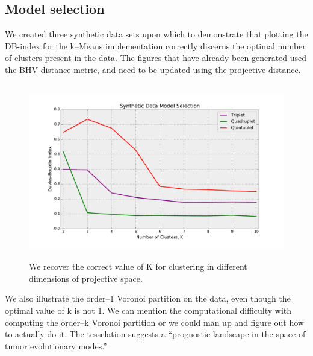 \documentclass[a4paper,11pt]{article}
\begin{document}
\subsection{Model selection}

We created three synthetic data sets upon which to demonstrate that plotting the DB-index for the k--Means implementation correctly discerns the optimal number of clusters present in the data.
The figures that have already been generated used the BHV distance metric, and need to be updated using the projective distance.

\begin{figure}[t!]
    \centering
    \includegraphics[height=3in]{figures/synthetic_davies_bouldin.pdf}
    \caption{We recover the correct value of K for clustering in different dimensions of projective space.}
    \label{fig:davies_bouldin}
\end{figure}


We also illustrate the order--1 Voronoi partition on the data, even though the optimal value of k is not 1.
We can mention the computational difficulty with computing the order--k Voronoi partition or we could man up and figure out how to actually do it.
The tesselation suggests a ``prognostic landscape in the space of tumor evolutionary modes.'' 


\end{document}
